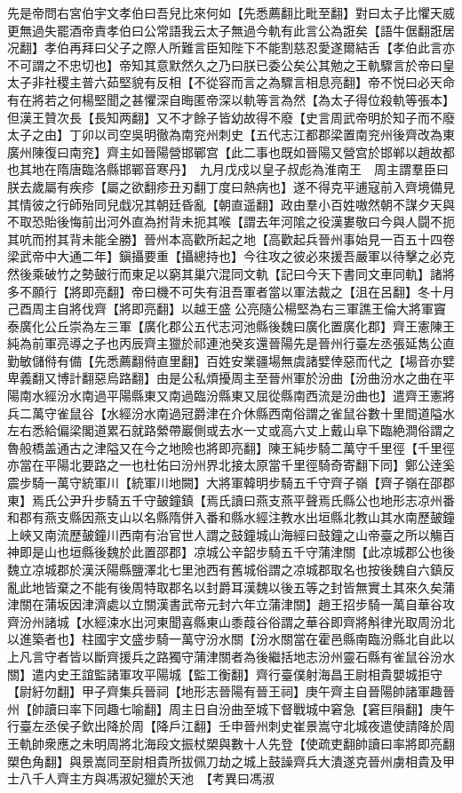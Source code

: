 先是帝問右宮伯宇文孝伯曰吾兒比來何如【先悉薦翻比毗至翻】對曰太子比懼天威更無過失罷酒帝責孝伯曰公常語我云太子無過今軌有此言公為誑矣【語牛倨翻誑居况翻】孝伯再拜曰父子之際人所難言臣知陛下不能割慈忍愛遂爾結舌【孝伯此言亦不可謂之不忠切也】帝知其意默然久之乃曰朕已委公矣公其勉之王軌驟言於帝曰皇太子非社稷主普六茹堅貌有反相【不從容而言之為驟言相息亮翻】帝不悦曰必天命有在將若之何楊堅聞之甚懼深自晦匿帝深以軌等言為然【為太子得位殺軌等張本】但漢王贊次長【長知两翻】又不才餘子皆幼故得不廢【史言周武帝明於知子而不廢太子之由】丁卯以司空吳明徹為南兖州刺史【五代志江都郡梁置南兖州後齊改為東廣州陳復曰南兖】齊主如晉陽營邯鄲宫【此二事也既如晉陽又營宫於邯郸以趙故都也其地在隋唐臨洛縣邯鄲音寒丹】　九月戊戍以皇子叔彪為淮南王　周主謂羣臣曰朕去歲屬有疾疹【屬之欲翻疹丑刃翻丁度曰熱病也】遂不得克平逋寇前入齊境備見其情彼之行師殆同兒戱况其朝廷昏亂【朝直遥翻】政由羣小百姓嗷然朝不謀夕天與不取恐貽後悔前出河外直為拊背未扼其喉【謂去年河隂之役漢婁敬曰今與人闘不扼其吭而拊其背未能全勝】晉州本高歡所起之地【高歡起兵晉州事始見一百五十四卷梁武帝中大通二年】鎭攝要重【攝總持也】今往攻之彼必來援吾嚴軍以待擊之必克然後乘破竹之勢皷行而東足以窮其巢穴混同文軌【記曰今天下書同文車同軌】諸將多不願行【將即亮翻】帝曰機不可失有沮吾軍者當以軍法裁之【沮在呂翻】冬十月己酉周主自將伐齊【將即亮翻】以越王盛公亮隨公楊堅為右三軍譙王倫大將軍竇泰廣化公丘崇為左三軍【廣化郡公五代志河池縣後魏曰廣化置廣化郡】齊王憲陳王純為前軍亮導之子也丙辰齊主獵於祁連池癸亥還晉陽先是晉州行臺左丞張延雋公直勤敏儲偫有備【先悉薦翻偫直里翻】百姓安業疆場無虞諸嬖倖惡而代之【場音亦嬖卑義翻又博計翻惡烏路翻】由是公私煩擾周主至晉州軍於汾曲【汾曲汾水之曲在平陽南水經汾水南過平陽縣東又南過臨汾縣東又屈從縣南西流是汾曲也】遣齊王憲將兵二萬守雀鼠谷【水經汾水南過冠爵津在介休縣西南俗謂之雀鼠谷數十里間道隘水左右悉給偏梁閣道累石就路縈帶巖側或去水一丈或高六丈上戴山阜下臨絶澗俗謂之魯般橋盖通古之津隘又在今之地險也將即亮翻】陳王純步騎二萬守千里徑【千里徑亦當在平陽北要路之一也杜佑曰汾州界北接太原當千里徑騎奇寄翻下同】鄭公逹奚震步騎一萬守統軍川【統軍川地闕】大將軍韓明步騎五千守齊子嶺【齊子嶺在邵郡東】焉氏公尹升步騎五千守皷鐘鎮【焉氏讀曰燕支燕平聲焉氏縣公也地形志凉州番和郡有燕支縣因燕支山以名縣隋併入番和縣水經注教水出垣縣北教山其水南歷皷鐘上峽又南流歷皷鐘川西南有治官世人謂之鼓鐘城山海經曰鼓鐘之山帝臺之所以觴百神即是山也垣縣後魏於此置邵郡】凉城公辛韶步騎五千守蒲津關【此凉城郡公也後魏立凉城郡於漢沃陽縣鹽澤北七里池西有舊城俗謂之凉城郡取名也按後魏自六鎮反亂此地皆棄之不能有後周特取郡名以封爵耳漢魏以後五等之封皆無實土其來久矣蒲津關在蒲坂因津濟處以立關漢書武帝元封六年立蒲津關】趙王招步騎一萬自華谷攻齊汾州諸城【水經涑水出河東聞喜縣東山黍葭谷俗謂之華谷即齊將斛律光取周汾北以進築者也】柱國宇文盛步騎一萬守汾水關【汾水關當在霍邑縣南臨汾縣北自此以上凡言守者皆以斷齊援兵之路獨守蒲津關者為後繼括地志汾州靈石縣有雀鼠谷汾水關】遣内史王誼監諸軍攻平陽城【監工衡翻】齊行臺僕射海昌王尉相貴嬰城拒守【尉紆勿翻】甲子齊集兵晉祠【地形志晉陽有晉王祠】庚午齊主自晉陽帥諸軍趣晉州【帥讀曰率下同趣七喻翻】周主日自汾曲至城下督戰城中窘急【窘巨隕翻】庚午行臺左丞侯子欽出降於周【降戶江翻】壬申晉州刺史崔景嵩守北城夜遣使請降於周王軌帥衆應之未明周將北海段文振杖槊與數十人先登【使疏吏翻帥讀曰率將即亮翻槊色角翻】與景嵩同至尉相貴所拔佩刀劫之城上鼓譟齊兵大潰遂克晉州虜相貴及甲士八千人齊主方與馮淑妃獵於天池　【考異曰馮淑